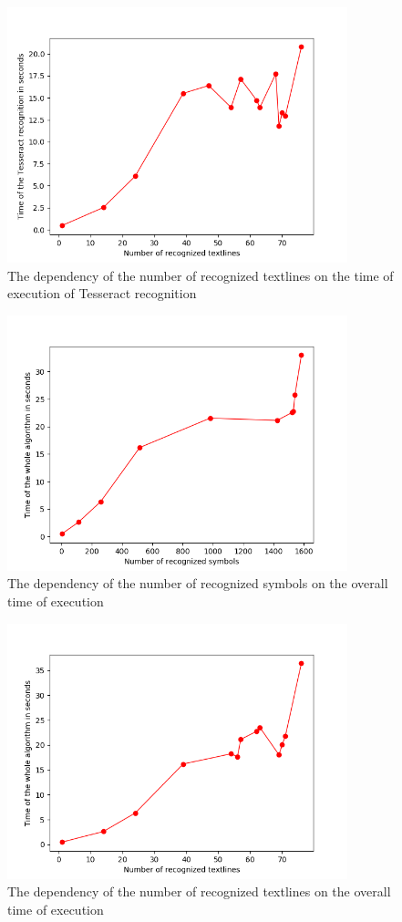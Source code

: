 \begin{figure}
\centering
\includegraphics[height=20em]{img/results/textlinesTimeTesseract.png}
\caption{The dependency of the number of recognized textlines on the time of execution of Tesseract recognition}
\label{fig:dpiSpeed}
\end{figure}

\begin{figure}
\centering
\includegraphics[height=20em]{img/results/symbolsTimeAll.png}
\caption{The dependency of the number of recognized symbols on the overall time of execution}
\label{fig:dpiSpeed}
\end{figure}

\begin{figure}
\centering
\includegraphics[height=20em]{img/results/textlinesTimeAll.png}
\caption{The dependency of the number of recognized textlines on the overall time of execution}
\label{fig:dpiSpeed}
\end{figure}

